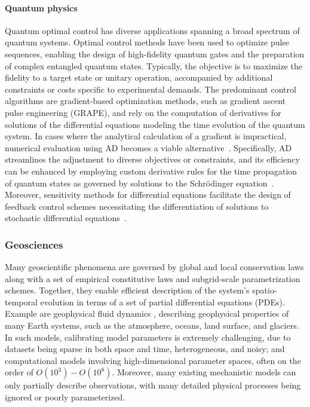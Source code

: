 
\paragraph{Quantum physics}

Quantum optimal control has diverse applications spanning a broad spectrum of quantum systems. 
Optimal control methods have been used to optimize pulse sequences, enabling the design of high-fidelity quantum gates and the preparation of complex entangled quantum states. 
Typically, the objective is to maximize the fidelity to a target state or unitary operation, accompanied by additional constraints or costs specific to experimental demands. 
The predominant control algorithms are gradient-based optimization methods, such as gradient ascent pulse engineering (GRAPE), and rely on the computation of derivatives for solutions of the differential equations modeling the time evolution of the quantum system. 
In cases where the analytical calculation of a gradient is impractical, numerical evaluation using AD becomes a viable alternative~\cite{jirari:2009, leung:2017, abdelhafez:2019, jirari2019quantum, abdelhafez:2020, schaefer:2020, goerz:2022}. 
Specifically, AD streamlines the adjustment to diverse objectives or constraints, and its efficiency can be enhanced by employing custom derivative rules for the time propagation of quantum states as governed by solutions to the Schrödinger equation~\cite{goerz:2022}. 
Moreover, sensitivity methods for differential equations facilitate the design of feedback control schemes necessitating the differentiation of solutions to stochastic differential equations~\cite{schaefer:2021}.


\subsubsection{Geosciences}

Many geoscientific phenomena are governed by global and local conservation laws along with a set of empirical constitutive laws and subgrid-scale parametrization schemes. 
Together, they enable efficient description of the system's spatio-temporal evolution in terms of a set of partial differential equations (PDEs).
Example are geophysical fluid dynamics \cite{Vallis:2016kv}, describing geophysical properties of many Earth systems, such as the atmosphere, oceans, land surface, and glaciers.
In such models, calibrating model parameters is extremely challenging, due to datasets being sparse in both space and time, heterogeneous, and noisy; and computational models involving high-dimensional parameter spaces, often on the order of $O(10^3) - O(10^8)$.
Moreover, many existing mechanistic models can only partially describe observations, with many detailed physical processes being ignored or poorly parameterized. 

